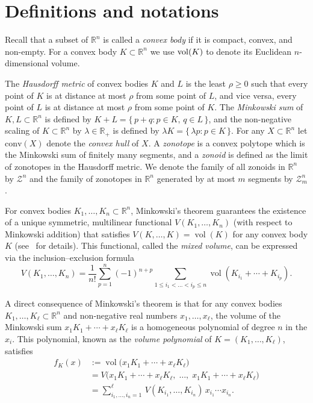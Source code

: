 \documentclass[11pt]{amsart}
\newcommand{\R}{\mathbb R}
\newcommand{\Z}{\mathcal Z}
\newcommand{\conv}{\mathrm{conv}}
\def\vol{{\rm vol}}
\theoremstyle{definition}
\theoremstyle{remark}
\begin{document}
\section{Definitions and notations}
\label{sec:def}
Recall that a subset of $\mathbb{R}^n$ is called a \emph{convex body} if it is compact, convex, and non-empty.  For a convex body $K\subset\R^n$ we use $\vol(K)$ to denote its Euclidean $n$-dimensional volume.

The \emph{Hausdorff metric} of convex bodies $K$ and $L$ is the least $\rho \geq 0$ such that every point of $K$ is at distance at most $\rho$ from some point of $L$, and vice versa, every point of $L$ is at distance at most $\rho$ from some point of $K$. The \emph{Minkowski sum} of $K, L \subset \mathbb{R}^n$ is defined by $K + L = \{\, p + q : p \in K, \, q \in L \,\}$, and the non-negative scaling of $K \subset \mathbb{R}^n$ by $\lambda \in \mathbb{R}_+$ is defined by $\lambda K = \{\, \lambda p : p \in K \,\}$. For any $X\subset\R^n$ let $\conv(X)$ denote the \emph{convex hull} of $X$.  A \emph{zonotope} is a convex polytope which is the Minkowski sum of finitely many segments, %
and a \emph{zonoid} is defined as the limit of zonotopes in the Hausdorff metric. We denote the family of all zonoids in $\mathbb{R}^n$ by $\Z^n$ and the family of zonotopes in $\mathbb{R}^n$ generated by at most $m$ segments by $\Z^n_m$.

For convex bodies $K_1,\dots,K_n\subset\mathbb{R}^n$, Minkowski's theorem %
guarantees the existence of a unique symmetric, multilinear functional $V(K_1,\dots,K_n)$ (with respect to Minkowski addition) that satisfies $V(K,\dots,K)=\operatorname{vol}(K)$ for any convex body $K$ (see~\cite[Section~5.1]{Sch} for details). This functional, called the \emph{mixed volume}, can be expressed via the inclusion–exclusion formula
\[
V(K_1,\dots,K_n)=\frac{1}{n!}\sum_{p=1}^n(-1)^{n+p}\!\!
\sum_{1\le i_1<\dots<i_p\le n}
\operatorname{vol}\!\left(K_{i_1}+\cdots+K_{i_p}\right). 
\]

A direct consequence of Minkowski's theorem is that for any convex bodies $K_1,\dots,K_\ell\subset\mathbb{R}^n$ and non‑negative real numbers $x_1,\dots,x_\ell$, the volume of the Minkowski sum $x_1K_1+\cdots+x_\ell K_\ell$ is a homogeneous polynomial of degree $n$ in the $x_i$. This polynomial, known as the \emph{volume polynomial} of $K=(K_1,\dots,K_\ell)$, satisfies
\begin{align*}
f_K(x) &:=\operatorname{vol}\bigl(x_1K_1+\cdots+x_\ell K_\ell\bigr)\\
&= V\bigl(x_1K_1+\cdots+x_\ell K_\ell,\;\dots,\;x_1K_1+\cdots+x_\ell K_\ell\bigr)\\
&= \sum_{i_1,\dots,i_n=1}^\ell \,V(K_{i_1},\dots,K_{i_n})\,x_{i_1}\cdots x_{i_n}.
\end{align*}
\end{document}
